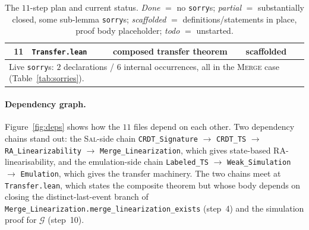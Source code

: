 \documentclass[11pt,a4paper]{article}
\theoremstyle{definition}
\theoremstyle{remark}
\newcommand{\Sal}{\textsc{Sal}}
\newcommand{\Emul}{\mathcal{G}}
\newcommand{\sorry}{\texttt{sorry}}
\begin{document}
\begin{table}[t]
\begin{tabular}{@{}rlp{7.8cm}l@{}}
    11 & \texttt{Transfer.lean} & composed transfer theorem & scaffolded \\
    \midrule
    \multicolumn{4}{l}{\footnotesize Live \texttt{sorry}s: $2$ declarations / $6$ internal occurrences, all in the \textsc{Merge} case (Table~\ref{tab:sorries}).}\\
    \bottomrule
  \end{tabular}
  \caption{The $11$-step plan and current status.
    \emph{Done} $=$ no \sorry{}s; \emph{partial} $=$ substantially
    closed, some sub-lemma \sorry{}s; \emph{scaffolded} $=$
    definitions/statements in place, proof body placeholder;
    \emph{todo} $=$ unstarted.}
  \label{tab:status}
\end{table}

\paragraph{Dependency graph.}
Figure~\ref{fig:deps} shows how the $11$ files depend on each other.
Two dependency chains stand out: the \Sal{}-side chain
\texttt{CRDT\_Signature} $\to$ \texttt{CRDT\_TS} $\to$
\texttt{RA\_Linearizability} $\to$ \texttt{Merge\_Linearization},
which gives state-based RA-linearisability, and the emulation-side
chain \texttt{Labeled\_TS} $\to$ \texttt{Weak\_Simulation}
$\to$ \texttt{Emulation}, which gives the transfer machinery. The
two chains meet at \texttt{Transfer.lean}, which states the
composite theorem but whose body depends on closing the
distinct-last-event branch of
\texttt{Merge\_Linearization.merge\_linearization\_exists}
(step~4) and the simulation proof for $\Emul$ (step~10).
\end{document}
